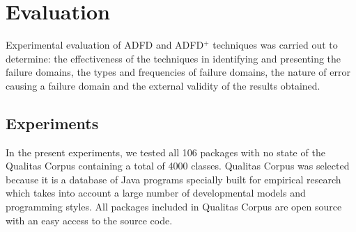 \begin{enumerate}
%

%
%


\end{enumerate}




\section{Evaluation}
Experimental evaluation of ADFD and ADFD$^+$ techniques was carried out to determine: the effectiveness of the techniques in identifying and presenting the failure domains, the types and frequencies of failure domains, the nature of error causing a failure domain and the external validity of the results obtained. 


\subsection{Experiments}
In the present experiments, we tested all 106 packages with no state of the Qualitas Corpus containing a total of 4000 classes. Qualitas Corpus was selected because it is a database of Java programs specially built for empirical research which takes into account a large number of developmental models and programming styles. All packages included in Qualitas Corpus are open source with an easy access to the source code.

